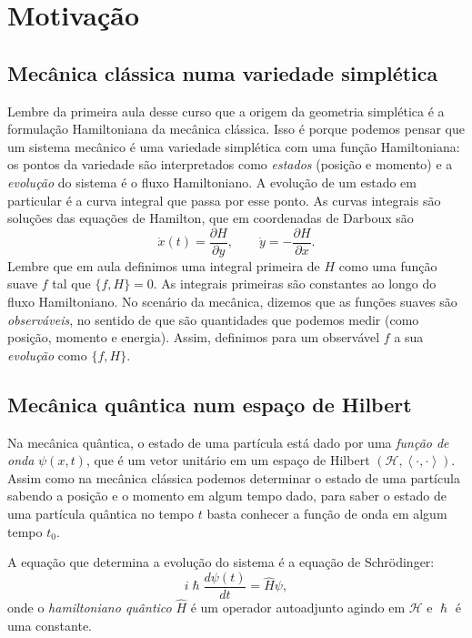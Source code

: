 \section{Motivação}


\subsection{Mecânica clássica numa variedade simplética}

Lembre da primeira aula desse curso que a origem da geometria simplética é a formulação Hamiltoniana da mecânica clássica. Isso é porque podemos pensar que um sistema mecânico é uma variedade simplética com uma função Hamiltoniana: os pontos da variedade são interpretados como \textit{estados} (posição e momento) e a \textit{evolução} do sistema é o fluxo Hamiltoniano. A evolução de um estado em particular é a curva integral que passa por esse ponto. As curvas integrais são soluções das equações de Hamilton, que em coordenadas de Darboux são
\[\dot x(t)=\frac{\partial H}{\partial y},\qquad \dot y=-\frac{\partial H}{\partial x}.\]
Lembre que em aula definimos uma integral primeira de $H$ como uma função suave $f$ tal que $\{f,H\}=0$. As integrais primeiras são constantes ao longo do fluxo Hamiltoniano. No scenário da mecânica, dizemos que as funções suaves são \textit{observáveis}, no sentido de que são quantidades que podemos medir (como posição, momento e energia). Assim, definimos para um observável $f$ a sua  \textit{evolução} como $\{f, H\}$.

\subsection{Mecânica quântica num espaço de Hilbert}

Na mecânica quântica, o estado de uma partícula está dado por uma \textit{função de onda} $\psi(x,t)$, que é um vetor unitário em um espaço de Hilbert $(\mathcal{H},\left<\cdot,\cdot\right>)$. Assim como na mecânica clássica podemos determinar o estado de uma partícula sabendo a posição e o momento em algum tempo dado, para saber o estado de uma partícula quântica no tempo $t$ basta conhecer a função de onda em algum tempo $t_0$.

A equação que determina a evolução do sistema é a equação de Schrödinger:
\[i \hslash \frac{d\psi(t)}{dt}=\hat{H}\psi,\]
onde o \textit{hamiltoniano quântico} $\hat{H}$ é um operador autoadjunto agindo em $\mathcal{H}$ e $\hslash$ é uma constante.

